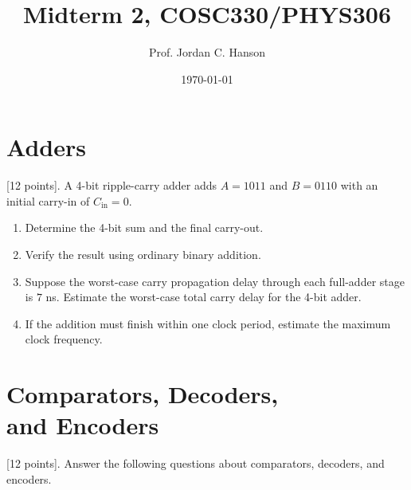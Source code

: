 \documentclass[10pt]{article}
\begin{document}
\twocolumn

\title{Midterm 2, COSC330/PHYS306}
\author{Prof. Jordan C. Hanson}
\date{\today}
\maketitle

\section{Adders}

[12 points]. A 4-bit ripple-carry adder adds $A=1011$ and $B=0110$ with an initial carry-in of $C_{\mathrm{in}}=0$.

\begin{enumerate}
\item Determine the 4-bit sum and the final carry-out. \\ \vspace{1.5cm}
\item Verify the result using ordinary binary addition. \\ \vspace{0.5cm}
\item Suppose the worst-case carry propagation delay through each full-adder stage is $7$ ns. Estimate the worst-case total carry delay for the 4-bit adder. \\ \vspace{1.5cm}
\item If the addition must finish within one clock period, estimate the maximum clock frequency. \\ \vspace{1.5cm}
\end{enumerate}

\section{Comparators, Decoders, \\ and Encoders}

[12 points]. Answer the following questions about comparators, decoders, and encoders.
\end{document}
